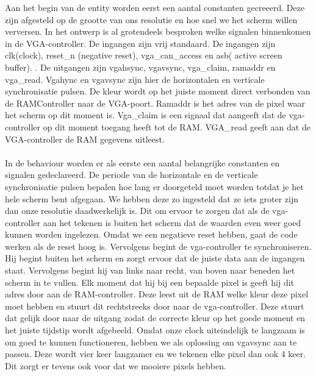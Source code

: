 \documentclass{scrartcl}  %
\begin{document}
Aan het begin van de entity worden eerst een aantal constanten gecreeerd. Deze zijn afgesteld op de grootte van ons resolutie en hoe snel we het scherm willen verversen. In het ontwerp is al grotendeels besproken welke signalen binnenkomen in de VGA-controller. De ingangen zijn vrij standaard. De ingangen zijn clk(clock), reset\_n (negative reset), vga\_can\_access en asb( active screen buffer). . De uitgangen zijn vgahsync, vgavsync, vga\_claim, ramaddr en vga\_read. Vgahync en vgavsync zijn hier de horizontalen en verticale synchronisatie pulsen. De kleur wordt op het juiste moment direct verbonden van de RAMController naar de VGA-poort. Ramaddr is het adres van de pixel waar het scherm op dit moment is. Vga\_claim is een signaal dat aangeeft dat de vga-controller op dit moment toegang heeft tot de RAM. VGA\_read geeft aan dat de VGA-controller de RAM gegevens uitleest.
\\\\
 In de behaviour worden er als eerste  een aantal belangrijke constanten en signalen gedeclareerd. De periode van de horizontale en de verticale synchronisatie pulsen bepalen hoe lang er doorgeteld moet worden totdat je het hele scherm bent afgegaan. We hebben deze zo ingesteld dat ze iets groter zijn dan onze resolutie daadwerkelijk is. Dit om ervoor te zorgen dat als de vga-controller aan het tekenen is buiten het scherm dat de waarden even weer goed kunnen worden ingelezen. Omdat we een negatieve reset hebben, gaat de code werken als de reset hoog is. Vervolgens begint de vga-controller te synchroniseren. Hij begint buiten het scherm en zorgt ervoor dat de juiste data aan de ingangen staat. Vervolgens begint hij van links naar recht, van boven naar beneden het scherm in te vullen. Elk moment dat hij bij een bepaalde pixel is geeft hij dit adres door aan de RAM-controller. Deze leest uit de RAM welke kleur deze pixel moet hebben en stuurt dit rechtstreeks door naar de vga-controller. Deze stuurt dat gelijk door naar de uitgang zodat de correcte kleur op het goede moment en het juiste tijdstip wordt afgebeeld. Omdat onze clock uiteindelijk te langzaam is om goed te kunnen functioneren, hebben we als oplossing om vgavsync aan te passen. Deze wordt vier keer langzamer en we tekenen elke pixel dan ook 4 keer. Dit zorgt er tevens ook voor dat we mooiere pixels hebben. 
\end{document}
